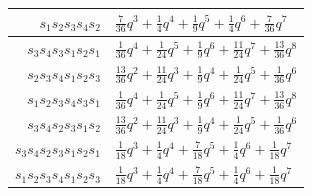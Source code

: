 \documentclass{amsart}
\theoremstyle{definition}
\begin{document}
\begin{table}[p]
{\begin{tabular}{|r|l|}
    $s_1s_2s_3s_4s_2$& $\frac{7}{36}q^3 + \frac{1}{4}q^4 + \frac{1}{9}q^5 + \frac{1}{4}q^6 + \frac{7}{36}q^7$\\
    \hline
    $s_3s_4s_3s_1s_2s_1$ & $\frac{1}{36}q^4 + \frac{1}{24}q^5 + \frac{1}{9}q^6 + \frac{11}{24}q^7 + \frac{13}{36}q^8$ \\
    $s_2s_3s_4s_1s_2s_3$ & $\frac{13}{36}q^2 + \frac{11}{24}q^3 + \frac{1}{9}q^4 + \frac{1}{24}q^5 + \frac{1}{36}q^6$ \\
    \hline
    $s_1s_2s_3s_4s_3s_1$ & $\frac{1}{36}q^4 + \frac{1}{24}q^5 + \frac{1}{9}q^6 + \frac{11}{24}q^7 + \frac{13}{36}q^8$ \\
    $s_3s_4s_2s_3s_1s_2$ & $\frac{13}{36}q^2 + \frac{11}{24}q^3 + \frac{1}{9}q^4 + \frac{1}{24}q^5 + \frac{1}{36}q^6$\\
    \hline
    $s_3s_4s_2s_3s_1s_2s_1$ & $\frac{1}{18}q^3 + \frac{1}{4}q^4 + \frac{7}{18}q^5 + \frac{1}{4}q^6 + \frac{1}{18}q^7$ \\
    $s_1s_2s_3s_4s_1s_2s_3$ & $\frac{1}{18}q^3 + \frac{1}{4}q^4 + \frac{7}{18}q^5 + \frac{1}{4}q^6 + \frac{1}{18}q^7$ \\
    \hline
    \hline
    

\end{tabular}}
\end{table}
\end{document}
